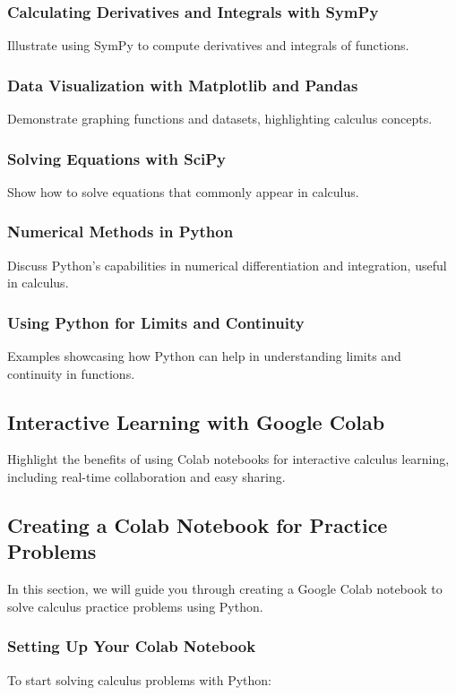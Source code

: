 \documentclass[a4paper,12pt]{book}
\newcounter{problem}
\begin{document}
\subsubsection*{Calculating Derivatives and Integrals with SymPy}
Illustrate using SymPy to compute derivatives and integrals of functions.

\subsubsection*{Data Visualization with Matplotlib and Pandas}
Demonstrate graphing functions and datasets, highlighting calculus concepts.

\subsubsection*{Solving Equations with SciPy}
Show how to solve equations that commonly appear in calculus.

\subsubsection*{Numerical Methods in Python}
Discuss Python's capabilities in numerical differentiation and integration, useful in calculus.

\subsubsection*{Using Python for Limits and Continuity}
Examples showcasing how Python can help in understanding limits and continuity in functions.

\subsection*{Interactive Learning with Google Colab}
Highlight the benefits of using Colab notebooks for interactive calculus learning, including real-time collaboration and easy sharing.

\subsection*{Creating a Colab Notebook for Practice Problems}

In this section, we will guide you through creating a Google Colab notebook to solve calculus practice problems using Python.

\subsubsection*{Setting Up Your Colab Notebook}
To start solving calculus problems with Python:
\end{document}
